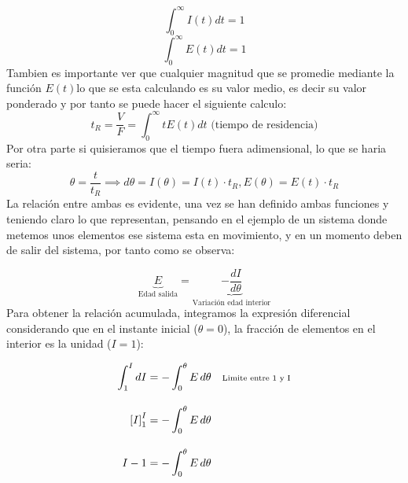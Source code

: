 \begin{equation}
    \int_{0}^{\infty} I(t) dt = 1
\end{equation}
\begin{equation}
    \int_{0}^{\infty} E(t) dt = 1
\end{equation}
\noindent Tambien es importante ver que cualquier magnitud que se promedie mediante la función $E(t)$lo que se esta calculando es su valor medio, es decir su valor ponderado y por tanto se puede hacer el siguiente calculo:
\begin{equation}
    t_R = \frac{V}{F} = \int_{0}^{\infty} t E(t) dt \text{ (tiempo de residencia)}
\end{equation}
\noindent Por otra parte si quisieramos que el tiempo fuera adimensional, lo que se haria seria:
\begin{equation}
    \theta = \frac{t}{t_R} \implies d\theta = I(\theta) = I(t)\cdot t_R , E(\theta) = E(t)\cdot t_R
\end{equation}
\noindent La relación entre ambas es evidente, una vez se han definido ambas funciones y teniendo claro lo que representan, pensando en el ejemplo de un sistema donde metemos unos elementos ese sistema esta en movimiento, y en un momento deben de salir del sistema, por tanto como se observa:

\begin{equation}
    \underbrace{E}_{\text{Edad salida}} = \underbrace{-\frac{dI}{d\theta}}_{\text{Variación edad interior}} \label{eq:defE}
\end{equation}
\noindent Para obtener la relación acumulada, integramos la expresión diferencial considerando que en el instante inicial ($\theta = 0$), la fracción de elementos en el interior es la unidad ($I = 1$):

\begin{align*}
    \int_{1}^{I} dI          & = -\int_{0}^{\theta} E \, d\theta \quad \text{\scriptsize{Limite entre 1 y I}} \\[10pt]
    \left[ I \right]_{1}^{I} & = -\int_{0}^{\theta} E \, d\theta                                              \\[10pt]
    I - 1                    & = -\int_{0}^{\theta} E \, d\theta
\end{align*}

